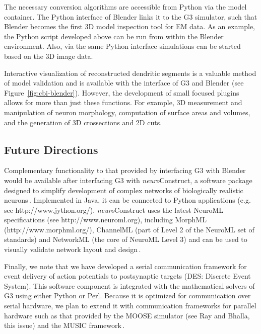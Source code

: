 \documentclass[12pt]{article}
\begin{document}
{The necessary conversion algorithms are accessible from Python via the
model container.  The Python interface of Blender links it to the G3
simulator, such that Blender becomes the first 3D model inspection
tool for EM data.  As an example, the Python script developed above
can be run from within the Blender environment.  Also, via the same
Python interface simulations can be started based on the 3D image
data.

Interactive visualization of reconstructed dendritic segments is a
valuable method of model validation and is available with the
interface of G3 and Blender (see Figure~\ref{fig:cbi-blender}).
However, the development of small focused plugins allows for more than
just these functions. For example, 3D measurement and manipulation of
neuron morphology, computation of surface areas and volumes, and the
generation of 3D crossections and 2D cuts.

\subsection{Future Directions}
Complementary functionality to that provided by interfacing G3 with
Blender would be available after interfacing G3 with {\it
  neuro}Construct, a software package designed to simplify development
of complex networks of biologically realistic
neurons\,\cite{gleeson05:_build_networ_model}.  Implemented in Java,
it can be connected to Python applications (e.g. see
http://www.jython.org/).  {\it neuro}Construct uses the latest NeuroML
specifications (see http://www.neuroml.org), including MorphML
(http://www.morphml.org/), ChannelML (part of Level 2 of the NeuroML
set of standards) and NetworkML (the core of NeuroML Level 3) and can
be used to visually validate network layout and
design\,\cite{crook07:_morph}.

Finally, we note that we have developed a serial communication
framework for event delivery of action potentials to postsynaptic
targets (DES: Discrete Event System).  This software component is
integrated with the mathematical solvers of G3 using either Python or
Perl.  Because it is optimized for communication over serial hardware,
we plan to extend it with communication frameworks for parallel
hardware such as that provided by the MOOSE simulator (see Ray and
Bhalla, this issue) and the MUSIC
framework\,\cite{ekeberg08:_music_multis_coord}.


}
\end{document}
